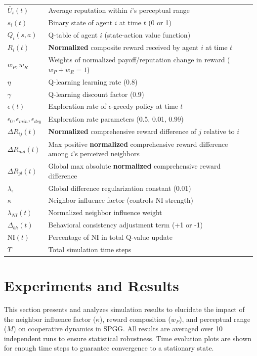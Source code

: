 \documentclass[preprint,number,sort&compress,12pt]{elsarticle}
\begin{document}
\begin{table}[htbp]
\begin{tabular}{@{}ll@{}}
$\bar{U}_i(t)$ & Average reputation within $i$'s perceptual range \\
$s_i(t)$ & Binary state of agent $i$ at time $t$ (0 or 1) \\
$Q_i(s, a)$ & Q-table of agent $i$ (state-action value function) \\
$R_i(t)$ & \textbf{Normalized} composite reward received by agent $i$ at time $t$ \\
$w_P, w_R$ & Weights of normalized payoff/reputation change in reward ($w_P+w_R=1$) \\
$\eta$ & Q-learning learning rate (0.8) \\
$\gamma$ & Q-learning discount factor (0.9) \\
$\epsilon(t)$ & Exploration rate of $\epsilon$-greedy policy at time $t$ \\
$\epsilon_0, \epsilon_{min}, \epsilon_{dcy}$ & Exploration rate parameters (0.5, 0.01, 0.99) \\
$\Delta R_{ij}(t)$ & \textbf{Normalized} comprehensive reward difference of $j$ relative to $i$ \\
$\Delta R_{md}(t)$ & Max positive \textbf{normalized} comprehensive reward difference among $i$'s perceived neighbors \\
$\Delta R_{gl}(t)$ & Global max absolute \textbf{normalized} comprehensive reward difference  \\
$\lambda_{\epsilon}$ & Global difference regularization constant (0.01) \\
$\kappa$ & Neighbor influence factor (controls NI strength) \\
$\lambda_{NI}(t)$ & Normalized neighbor influence weight \\
$\Delta_{bh}(t)$ & Behavioral consistency adjustment term (+1 or -1) \\
$\text{NI}(t)$ & Percentage of NI in total Q-value update \\
$T$ & Total simulation time steps \\
\bottomrule
\end{tabular}
\end{table}


\section{Experiments and Results}
\label{sec:results}

This section presents and analyzes simulation results to elucidate the impact of the neighbor influence factor ($\kappa$), reward composition ($w_P$), and perceptual range ($M$) on cooperative dynamics in SPGG. All results are averaged over 10 independent runs to ensure statistical robustness. Time evolution plots are shown for enough time steps to guarantee convergence to a stationary state.
\end{document}
